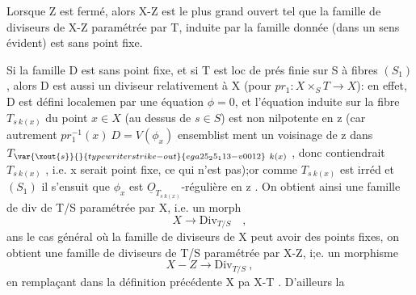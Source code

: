 
 Lorsque Z est fermé, alors X-Z est le plus grand ouvert
tel que la famille de diviseurs de X-Z paramétrée par T, induite par la
famille donnée (dans un sens évident) est sans point fixe.

Si la famille D est sans point fixe, et si T est  loc de prés finie
sur S à fibres $(S_1)$, alors D est aussi un diviseur 
relativement à X (pour $pr_1 : X\times_S T \longrightarrow X$): en effet, D est défini localemen
 par une équation  $\phi = 0$, et l'équation induite sur la fibre
$T_{s\ k(x)}$ du point $x\in X$ (au dessus de $s\in S$) est non 
nilpotente en z (car autrement $pr_1^{-1}(x)\ D = V(\phi_x)$   ensemblist
ment un voisinage de z dans $T_{\var{\xout{s}}{}{typewriter strike-out}{ega25_25_113-v0012}\ k(x)}$ , donc contiendrait $T_{s\ k(x)}$ , i.e.
x serait point fixe, ce qui n'est pas);or comme $T_{s\ k(x)}$ est irréd et $(S_1)$
il s'ensuit que $\phi_x$ est $\underline{O}_{T_{s\ k(x)}}$-régulière en z . On obtient ainsi
 une famille de div de T/S paramétrée par X, i.e. un morph
\[ X \longrightarrow \mathrm{Div}_{T/S} \quad , \]
ans le cas général où la famille de diviseurs de X peut avoir des points
fixes, on obtient une famille de diviseurs de T/S paramétrée par X-Z,
i;e. un morphisme
\[ X - Z \longrightarrow \mathrm{Div}_{T/S} \ , \]
en remplaçant dans la définition précédente X pa X-T . D'ailleurs la

